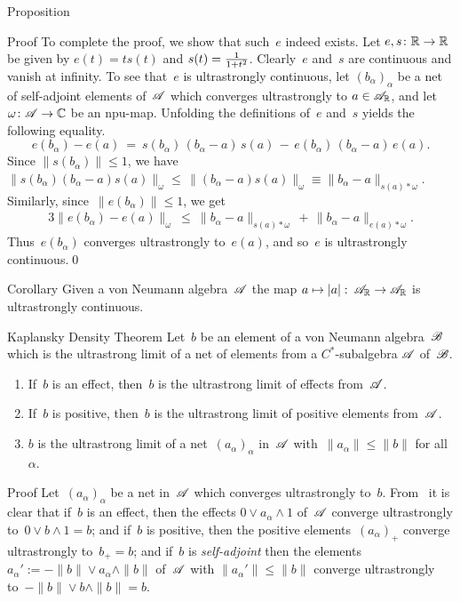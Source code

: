 \documentclass[a]{subfiles}
\begin{document}
\begin{parsec}
\begin{point}{Proposition}
\begin{point}{Proof}
To complete the proof,
we show that such~$e$ indeed exists.
Let $e,s\colon \mathbb{R}\to\mathbb{R}$ 
be given by $e(t)=ts(t)$ and $s(t)=\smash{\frac{1}{1+t^2}}$.
Clearly~$e$ and~$s$
are continuous
and
vanish at infinity.
To see that~$e$ is ultrastrongly continuous,
let $(b_\alpha)_\alpha$ be a net of self-adjoint elements of~$\mathscr{A}$
which converges ultrastrongly to $a\in\mathscr{A}_{\mathbb{R}}$,
and let~$\omega\colon \mathscr{A}\to \mathbb{C}$
be an npu-map. 
Unfolding the definitions
of~$e$ and~$s$ yields
the following equality.
\begin{equation*}
e(b_\alpha)-e(a) \ =\ s(b_\alpha)\,(b_\alpha-a)\,s(a)
\,-\, e(b_\alpha)\,(b_\alpha-a)\,e(a).
\end{equation*}
Since $\|s(b_\alpha)\|\leq 1$,
we have $\|s(b_\alpha)(b_\alpha-a)s(a)\|_\omega 
\leq  \,\|(b_\alpha-a)s(a)\|_\omega
\equiv \|b_\alpha-a\|_{s(a)*\omega}$.
Similarly, since~$\|e(b_\alpha)\|\leq 1$,
we get
\begin{alignat*}{3}
\|e(b_\alpha)-e(a)\|_\omega
\ \leq\ \|b_\alpha-a\|_{s(a)*\omega}\,+\,\|b_\alpha-a\|_{e(a)*\omega}.
\end{alignat*}
Thus~$e(b_\alpha)$ converges ultrastrongly to~$e(a)$,
and so~$e$ is ultrastrongly continuous.\qed
\end{point}
\end{point}

\begin{point}{Corollary}%
Given a von Neumann algebra~$\mathscr{A}$
the map $a\mapsto\left|a\right|\colon\,\mathscr{A}_{\mathbb{R}}\to\mathscr{A}_{\mathbb{R}}$
is ultrastrongly continuous.
\end{point}
\begin{point}[kaplansky]{Kaplansky Density Theorem}%
Let~$b$ be an element of a von Neumann algebra~$\mathscr{B}$
which is the ultrastrong limit of a net
of elements
from a $C^*$-subalgebra $\mathscr{A}$ of~$\mathscr{B}$.
\begin{enumerate}
\item
If~$b$ is an effect,
then~$b$ is the ultrastrong limit of effects from~$\mathscr{A}$.
\item
If~$b$ is positive,
then~$b$ is the ultrastrong limit of positive elements from~$\mathscr{A}$.
\item
$b$ is the ultrastrong limit of a net~$(a_\alpha)_\alpha$
in~$\mathscr{A}$ with~$\|a_\alpha\|\leq\|b\|$ for all~$\alpha$.
\end{enumerate}
\begin{point}{Proof}%
Let~$(a_\alpha)_\alpha$
be a net in~$\mathscr{A}$ which converges ultrastrongly
to~$b$.
From~ it is clear that if~$b$ is an effect,
then the effects  $ 0\vee a_\alpha \wedge 1$
of~$\mathscr{A}$ 
converge ultrastrongly to~$ 0\vee b \wedge 1 = b$;
and if~$b$ is positive,
then the positive elements~$(a_\alpha)_+$
converge ultrastrongly to~$b_+=b$;
and if~$b$ is \emph{self-adjoint}
then the elements $a_\alpha':=-\|b\|\vee a_\alpha \wedge \|b\|$ 
of~$\mathscr{A}$ with $\|a_\alpha'\|\leq \|b\|$
converge ultrastrongly to~$-\|b\|\vee b \wedge \|b\|=b$.


\end{point}
\end{point}
\end{parsec}
\end{document}
